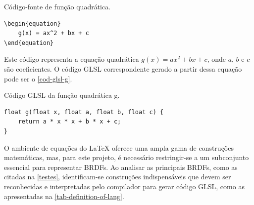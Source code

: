 \begin{codigo}[H]
\caption{\small Código-fonte de função quadrática.}
\label{equation-latex}
\begin{lstlisting}
\begin{equation}
    g(x) = ax^2 + bx + c
\end{equation}
\end{lstlisting}
\end{codigo}




Este código representa a equação quadrática \( g(x) = ax^2 + bx + c \), onde \( a \), \( b \) e \( c \) são coeficientes. O código GLSL correspondente gerado a partir dessa equação pode ser o \autoref{cod-glsl-g}.

\begin{codigo}[H]
\caption{\small Código GLSL da função quadrática g.}
\label{cod-glsl-g}
\begin{lstlisting}
float g(float x, float a, float b, float c) {
    return a * x * x + b * x + c;
}
\end{lstlisting}
\end{codigo}

O ambiente de equações do \LaTeX{} oferece uma ampla gama de construções matemáticas, mas, para este projeto, é necessário restringir-se a um subconjunto essencial para representar BRDFs. Ao analisar as principais BRDFs, como as citadas na \autoref{testes}, identificam-se construções indispensáveis que devem ser reconhecidas e interpretadas pelo compilador para gerar código GLSL, como as apresentadas na \autoref{tab-definition-of-lang}.

